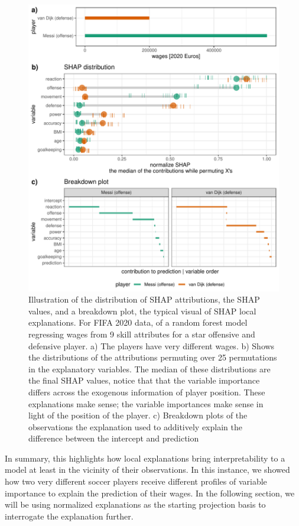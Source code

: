 \documentclass[
]{article}
\begin{document}
\begin{figure}

{\centering \includegraphics[width=29.17in]{./figures/shap_distr_bd} 

}

\caption{Illustration of the distribution of SHAP attributions, the SHAP values, and a breakdown plot, the typical visual of SHAP local explanations. For FIFA 2020 data, of a random forest model regressing wages from 9 skill attributes for a star offensive and defensive player. a) The players have very different wages. b) Shows the distributions of the attributions permuting over 25 permutations in the explanatory variables. The median of these distributions are the final SHAP values, notice that that the variable importance differs across the exogenous information of player position. These explanations make sense; the variable importances make sense in light of the position of the player. c) Breakdown plots of the observations the explanation used to additively explain the difference between the intercept and prediction}\label{fig:shapdistrbd}
\end{figure}

In summary, this highlights how local explanations bring interpretability to a model at least in the vicinity of their observations. In this instance, we showed how two very different soccer players receive different profiles of variable importance to explain the prediction of their wages. In the following section, we will be using normalized explanations as the starting projection basis to interrogate the explanation further.
\end{document}
